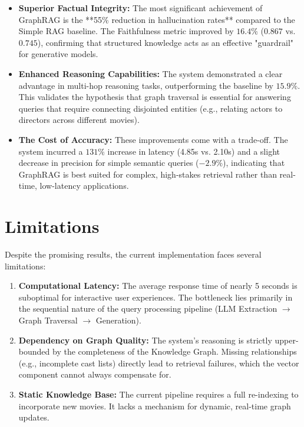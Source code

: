 \documentclass[a4paper, 12pt]{extreport}
\begin{document}
\begin{itemize}
    \item \textbf{Superior Factual Integrity:} The most significant achievement of GraphRAG is the **55\% reduction in hallucination rates** compared to the Simple RAG baseline. The Faithfulness metric improved by $16.4\%$ ($0.867$ vs. $0.745$), confirming that structured knowledge acts as an effective "guardrail" for generative models.
    \item \textbf{Enhanced Reasoning Capabilities:} The system demonstrated a clear advantage in multi-hop reasoning tasks, outperforming the baseline by $15.9\%$. This validates the hypothesis that graph traversal is essential for answering queries that require connecting disjointed entities (e.g., relating actors to directors across different movies).
    \item \textbf{The Cost of Accuracy:} These improvements come with a trade-off. The system incurred a $131\%$ increase in latency (4.85s vs. 2.10s) and a slight decrease in precision for simple semantic queries ($-2.9\%$), indicating that GraphRAG is best suited for complex, high-stakes retrieval rather than real-time, low-latency applications.
\end{itemize}

\section{Limitations}
Despite the promising results, the current implementation faces several limitations:
\begin{enumerate}
    \item \textbf{Computational Latency:} The average response time of nearly 5 seconds is suboptimal for interactive user experiences. The bottleneck lies primarily in the sequential nature of the query processing pipeline (LLM Extraction $\rightarrow$ Graph Traversal $\rightarrow$ Generation).
    \item \textbf{Dependency on Graph Quality:} The system's reasoning is strictly upper-bounded by the completeness of the Knowledge Graph. Missing relationships (e.g., incomplete cast lists) directly lead to retrieval failures, which the vector component cannot always compensate for.
    \item \textbf{Static Knowledge Base:} The current pipeline requires a full re-indexing to incorporate new movies. It lacks a mechanism for dynamic, real-time graph updates.
\end{enumerate}
\end{document}
